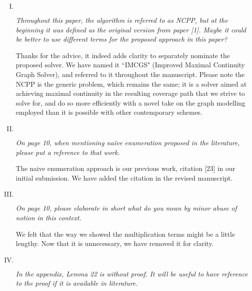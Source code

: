 \documentclass[11pt]{article}
\newenvironment{reviewer}
{\begin{mdframed}[roundcorner = 10pt,fontcolor=blue!70!black]\itshape}
{\end{mdframed}}
\begin{document}
\begin{enumerate}[I.]
  
\item $ $
\begin{reviewer}
Throughout this paper, the algorithm is referred to as NCPP, but at the beginning it was defined as the original version from paper [1]. Maybe it could be better to use different terms for the proposed approach in this paper? 
\end{reviewer}

\noindent 
Thanks for the advice, it indeed adds clarity to separately nominate the proposed solver. We have named it ``IMCGS" (Improved Maximal Continuity Graph Solver), and referred to it throughout the manuscript. Please note the NCPP is the generic problem, which remains the same; it is a solver aimed at achieving maximal continuity in the resulting coverage path that we strive to solve for, and do so more efficiently with a novel take on the graph modelling employed than it is possible with other contemporary schemes.
  
\item $ $
\begin{reviewer}
On page 10, when mentioning naïve enumeration proposed in the literature, please put a reference to that work. 
\end{reviewer}

\noindent
The naive enumeration approach is our previous work, citation [23] in our initial submission. We have added the citation in the revised manuscript. 

\item $ $
\begin{reviewer}
On page 10, please elaborate in short what do you mean by minor abuse of notion in this context. 
\end{reviewer}

\noindent
We felt that the way we showed the multiplication terms might be a little lengthy. Now that it is unnecessary, we have removed it for clarity. 

  \item $ $
  \begin{reviewer} 
    In the appendix, Lemma 22 is without proof. It will be useful to have reference to the proof if it is available in literature. 
  \end{reviewer}


\end{enumerate}
\end{document}
